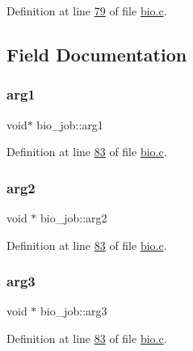 Definition at line \hyperlink{bio_8c_source_l00079}{79} of file \hyperlink{bio_8c_source}{bio.\+c}.



\subsection{Field Documentation}
\mbox{\label{structbio__job_a82f24d16132c2abb05e738c3a84fede2}} 
\subsubsection{\texorpdfstring{arg1}{arg1}}
{\footnotesize\ttfamily void$\ast$ bio\+\_\+job\+::arg1}



Definition at line \hyperlink{bio_8c_source_l00083}{83} of file \hyperlink{bio_8c_source}{bio.\+c}.

\mbox{\label{structbio__job_ad2c73641a7fdc6ecc59a7a653570e7a1}} 
\subsubsection{\texorpdfstring{arg2}{arg2}}
{\footnotesize\ttfamily void $\ast$ bio\+\_\+job\+::arg2}



Definition at line \hyperlink{bio_8c_source_l00083}{83} of file \hyperlink{bio_8c_source}{bio.\+c}.

\mbox{\label{structbio__job_aff4785b5f684214e4fe1ddeb8b61c63d}} 
\subsubsection{\texorpdfstring{arg3}{arg3}}
{\footnotesize\ttfamily void $\ast$ bio\+\_\+job\+::arg3}



Definition at line \hyperlink{bio_8c_source_l00083}{83} of file \hyperlink{bio_8c_source}{bio.\+c}.

\mbox{\label{structbio__job_a53ba1f8a9fbb41c152e809f9839822f4}} 
